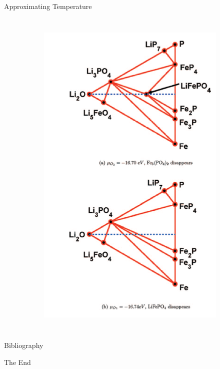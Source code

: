 \documentclass[aspectratio=169]{beamer}
\begin{document}
\begin{frame}{Approximating Temperature}
\begin{columns}
\begin{figure}
\begin{subfigure}{0.47\textwidth}
        \includegraphics[width=\linewidth]{lectures/figures/10_LFP_PD2.png}
    \end{subfigure}
\end{figure} 
\end{columns} 
\end{frame} 

    \begin{frame}[allowframebreaks]{Bibliography}
        
        
    \end{frame}



    \begin{frame}
        \Huge{\centerline{The End}}
    \end{frame}
\end{document}
